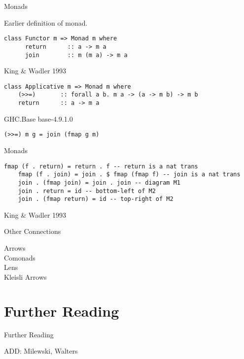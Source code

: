 \documentclass[10pt]{beamer}
\theoremstyle{definition}
\theoremstyle{remark}
\numberwithin{equation}{section}
\begin{document}
\begin{frame}[fragile]{Monads}

  Earlier definition of monad.
  
  \begin{lstlisting}[frame=single]
    class Functor m => Monad m where
      return      :: a -> m a
      join        :: m (m a) -> m a
  \end{lstlisting}

  {\small King \& Wadler 1993}
  
  \begin{lstlisting}[frame=single]
    class Applicative m => Monad m where
    (>>=)       :: forall a b. m a -> (a -> m b) -> m b
    return      :: a -> m a
  \end{lstlisting}

  {\small GHC.Base base-4.9.1.0}

  \begin{lstlisting}[frame=single]
    (>>=) m g = join (fmap g m)
  \end{lstlisting}

\end{frame}

\begin{frame}[fragile]{Monads}
  
  \begin{lstlisting}[frame=single]
    fmap (f . return) = return . f -- return is a nat trans
    fmap (f . join) = join . $ fmap (fmap f) -- join is a nat trans
    join . (fmap join) = join . join -- diagram M1
    join . return = id -- bottom-left of M2
    join . (fmap return) = id -- top-right of M2
  \end{lstlisting}

  {\small King \& Wadler 1993}
  
\end{frame}

\begin{frame}[fragile]{Other Connections}
  \begin{description}
  \item[Arrows] 
  \item[Comonads] 
  \item[Lens] 
  \item[Kleisli Arrows] 
  \end{description}
\end{frame}

\section{Further Reading}

\begin{frame}[fragile]{Further Reading}

  ADD: Milewski, Walters
  
  \nocite{elkins_calculating_2009}
  
  

\end{frame}
\end{document}
